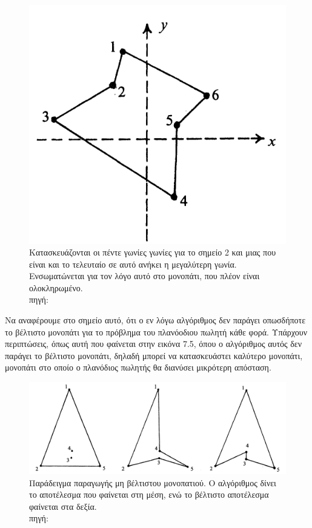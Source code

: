 \documentclass[oneside,12pt]{book}
\newenvironment{matlab}
	{\begin{figure}[hp]\centering\captionsetup{justification=centering}}
	{\end{figure}}
\theoremstyle{definition}
\begin{document}
\begin{matlab}
	\includegraphics[scale=0.5]{images/geometric_approach_angle4.png}
	\caption{Κατασκευάζονται οι πέντε γωνίες γωνίες για το σημείο 2 και μιας που είναι και το τελευταίο σε αυτό ανήκει η μεγαλύτερη γωνία. Ενσωματώνεται για τον λόγο αυτό στο  μονοπάτι, που πλέον είναι ολοκληρωμένο. \\ πηγή: \cite{16}}
\end{matlab} 

Να αναφέρουμε στο σημείο αυτό, ότι ο εν λόγω αλγόριθμος δεν παράγει οπωσδήποτε το βέλτιστο μονοπάτι για το πρόβλημα του πλανόοδιου πωλητή κάθε φορά. Υπάρχουν περιπτώσεις, όπως αυτή που φαίνεται στην εικόνα 7.5, όπου ο αλγόριθμος αυτός δεν παράγει το βέλτιστο μονοπάτι, δηλαδή μπορεί να κατασκευάστει καλύτερο μονοπάτι, μονοπάτι στο οποίο ο πλανόδιος πωλητής θα διανύσει μικρότερη απόσταση. \\

\begin{matlab}
	\includegraphics[scale=0.3]{images/geometric_approach_angle5.png}
	\caption{Παράδειγμα παραγωγής μη βέλτιστου μονοπατιού. Ο αλγόριθμος δίνει το αποτέλεσμα που φαίνεται στη μέση, ενώ το βέλτιστο αποτέλεσμα φαίνεται στα δεξία.\\ πηγή: \cite{16}}
\end{matlab} 
\end{document}
